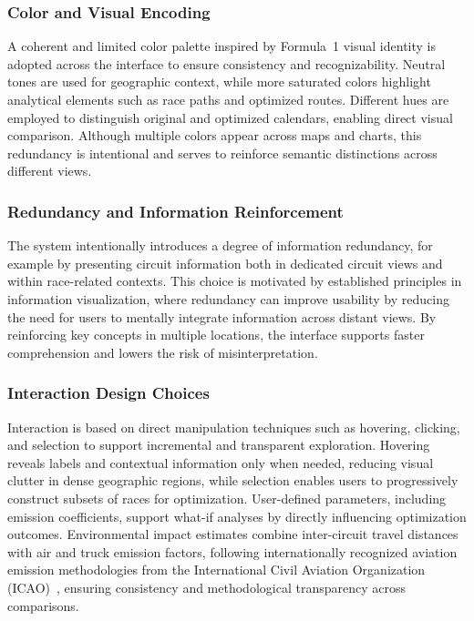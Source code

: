 \documentclass{egpubl}
\begin{document}
\subsubsection{Color and Visual Encoding}
A coherent and limited color palette inspired by Formula~1 visual identity is adopted across the interface to ensure consistency and recognizability. Neutral tones are used for geographic context, while more saturated colors highlight analytical elements such as race paths and optimized routes. Different hues are employed to distinguish original and optimized calendars, enabling direct visual comparison. Although multiple colors appear across maps and charts, this redundancy is intentional and serves to reinforce semantic distinctions across different views.  

\subsubsection{Redundancy and Information Reinforcement}
The system intentionally introduces a degree of information redundancy, for example by presenting circuit information both in dedicated circuit views and within race-related contexts. This choice is motivated by established principles in information visualization, where redundancy can improve usability by reducing the need for users to mentally integrate information across distant views. By reinforcing key concepts in multiple locations, the interface supports faster comprehension and lowers the risk of misinterpretation.

\subsubsection{Interaction Design Choices}
Interaction is based on direct manipulation techniques such as hovering, clicking, and selection to support incremental and transparent exploration. Hovering reveals labels and contextual information only when needed, reducing visual clutter in dense geographic regions, while selection enables users to progressively construct subsets of races for optimization. User-defined parameters, including emission coefficients, support what-if analyses by directly influencing optimization outcomes. Environmental impact estimates combine inter-circuit travel distances with air and truck emission factors, following internationally recognized aviation emission methodologies from the International Civil Aviation Organization (ICAO)~\cite{ICAOCalculatorAirFreight,ICAOCalculatorMethodology}, ensuring consistency and methodological transparency across comparisons.
\end{document}
